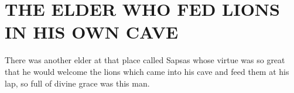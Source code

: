 \chapter{THE ELDER WHO FED LIONS IN HIS OWN CAVE}

There was another elder at that place called Sapsas whose virtue
was so great that he would welcome the lions which came into his
cave and feed them at his lap, so full of divine grace was this man.
